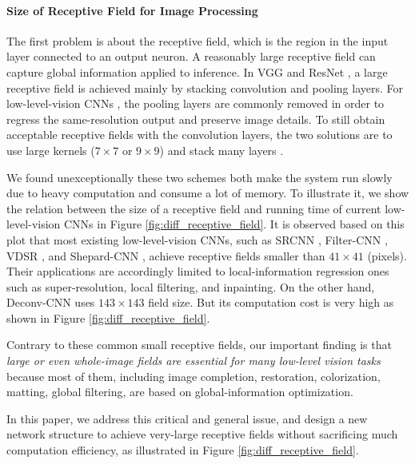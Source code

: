 \documentclass[10pt,twocolumn,letterpaper]{article}
\begin{document}
\vspace{-0.1in}\paragraph{Size of Receptive Field for Image Processing} The first problem
is about the receptive field, which is the region in the input layer connected to an
output neuron. A reasonably large receptive field can capture global information applied
to inference. In VGG \cite{SimonyanZ14a} and ResNet \cite{HeZRS15}, a large receptive
field is achieved mainly by stacking convolution and pooling layers. For low-level-vision
CNNs \cite{DongLHT16_SRCNN,XuRLJ14,KimLL15b,XuRYLJ15,LiHA016,DongLT16}, the pooling
layers are commonly removed in order to regress the same-resolution output and preserve
image details. To still obtain acceptable receptive fields with the convolution layers,
the two solutions are to use large kernels (\eg $7\times7$ or $9\times9$)
\cite{DongLHT16_SRCNN,XuRYLJ15,LiHA016} and stack many layers \cite{KimLL15b}.

We found unexceptionally these two schemes both make the system run slowly due to heavy
computation and consume a lot of memory. To illustrate it, we show the relation between
the size of a receptive field and running time of current low-level-vision CNNs in Figure
\ref{fig:diff_receptive_field}. It is observed based on this plot that most existing
low-level-vision CNNs, such as SRCNN \cite{DongLHT16_SRCNN}, Filter-CNN \cite{XuRYLJ15},
VDSR \cite{KimLL15b}, and Shepard-CNN \cite{RenXYS15}, achieve receptive fields smaller
than $41\times41$ (pixels). Their applications are accordingly limited to
local-information regression ones such as super-resolution, local filtering, and
inpainting. On the other hand, Deconv-CNN \cite{XuRLJ14} uses $143\times143$ field size.
But its computation cost is very high as shown in Figure \ref{fig:diff_receptive_field}.

Contrary to these common small receptive fields, our important finding is that {\it large
or even whole-image fields are essential for many low-level vision tasks} because most of
them, including image completion, restoration, colorization, matting, global filtering,
are based on global-information optimization.

In this paper, we address this critical and general issue, and design a new network
structure to achieve very-large receptive fields without sacrificing much computation
efficiency, as illustrated in Figure \ref{fig:diff_receptive_field}.
\end{document}

